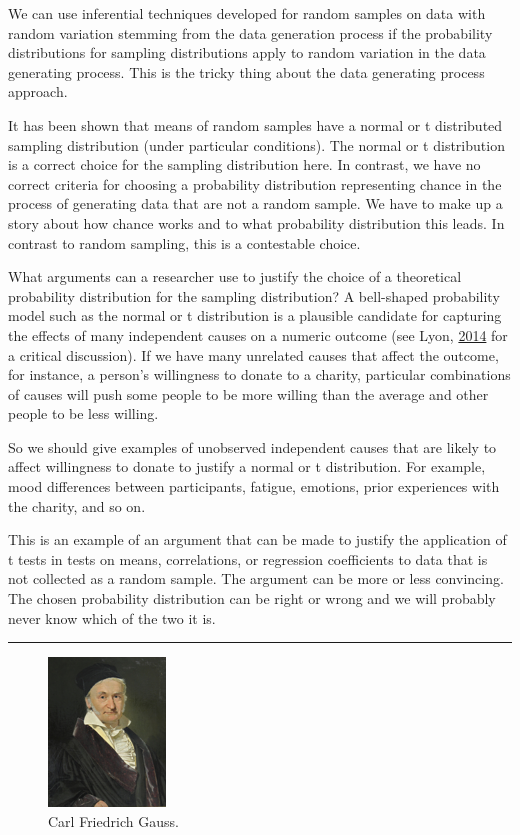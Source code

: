 \documentclass[a4paper]{book}
\theoremstyle{definition}
\theoremstyle{definition}
\theoremstyle{definition}
\theoremstyle{remark}
\begin{document}
We can use inferential techniques developed for random samples on data
with random variation stemming from the data generation process if the
probability distributions for sampling distributions apply to random
variation in the data generating process. This is the tricky thing about
the data generating process approach.

It has been shown that means of random samples have a normal or t
distributed sampling distribution (under particular conditions). The
normal or t distribution is a correct choice for the sampling
distribution here. In contrast, we have no correct criteria for choosing
a probability distribution representing chance in the process of
generating data that are not a random sample. We have to make up a story
about how chance works and to what probability distribution this leads.
In contrast to random sampling, this is a contestable choice.

What arguments can a researcher use to justify the choice of a
theoretical probability distribution for the sampling distribution? A
bell-shaped probability model such as the normal or t distribution is a
plausible candidate for capturing the effects of many independent causes
on a numeric outcome (see Lyon,
\protect\hyperlink{ref-RefWorks:3935}{2014} for a critical discussion).
If we have many unrelated causes that affect the outcome, for instance,
a person's willingness to donate to a charity, particular combinations
of causes will push some people to be more willing than the average and
other people to be less willing.

So we should give examples of unobserved independent causes that are
likely to affect willingness to donate to justify a normal or t
distribution. For example, mood differences between participants,
fatigue, emotions, prior experiences with the charity, and so on.

This is an example of an argument that can be made to justify the
application of t tests in tests on means, correlations, or regression
coefficients to data that is not collected as a random sample. The
argument can be more or less convincing. The chosen probability
distribution can be right or wrong and we will probably never know which
of the two it is.

\begin{center}\rule{0.5\linewidth}{\linethickness}\end{center}

\begin{figure}[H]
\centering
\includegraphics{figures/cfgauss.png}
\caption{Carl Friedrich Gauss.}
\end{figure}
\end{document}
